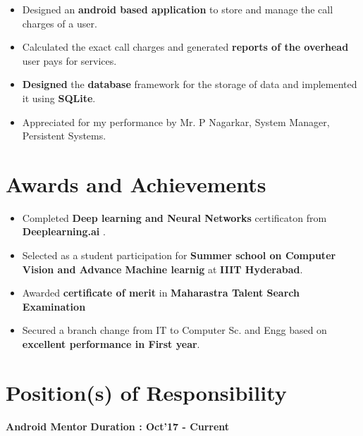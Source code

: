 \documentclass{article}
\begin{document}
\vspace*{.051mm}
\begin{itemize}[noitemsep]
	\item Designed an \textbf{android based application} to store and manage the call charges of a user.
	\item Calculated the exact call charges and generated \textbf{reports of the overhead} user pays for services.
	\item \textbf{Designed} the \textbf{database} framework for the storage of data and implemented it using \textbf{SQLite}.
	\item Appreciated for my performance by Mr. P Nagarkar, System Manager, Persistent Systems.
\end{itemize}

\vspace*{.051mm}






\section{Awards and Achievements}
\begin{itemize}[noitemsep]
	\item Completed \textbf{Deep learning and Neural Networks }certificaton from \textbf{Deeplearning.ai} .
	\item Selected as a student participation for \textbf{Summer school on Computer Vision and Advance Machine learnig} at \textbf{IIIT Hyderabad}.
	\item Awarded \textbf{certificate of merit} in \textbf{Maharastra Talent Search Examination}
	\item Secured a branch change from IT to Computer Sc. and Engg based on \textbf{excellent performance in First year}.
	
\end{itemize}

\section{Position(s) of Responsibility}




\vspace*{.3cm}
\textbf{Android Mentor} \hspace{11.3cm}
\textbf{Duration : Oct'17 - Current }  
\end{document}
